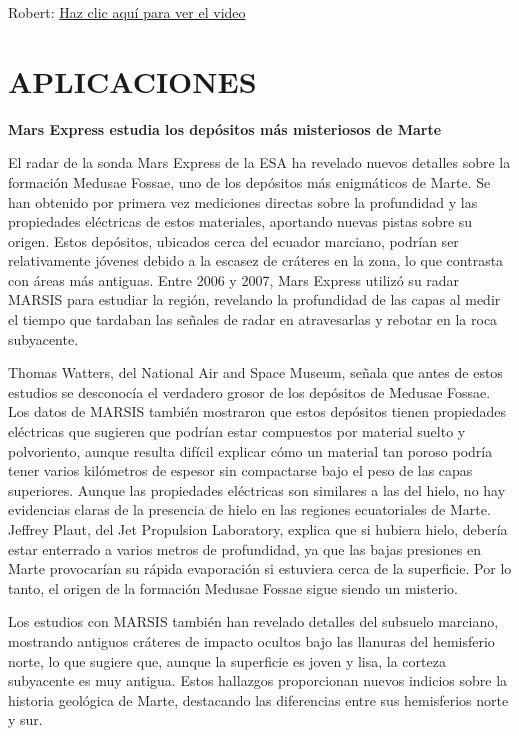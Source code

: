 \documentclass[a4paper]{article}
\begin{document}
\begin{center}
    Robert: \href{https://www.youtube.com/watch?v=k0rbV8mAiCY&ab_channel=MarteEspa%C3%B1ol}{Haz clic aquí para ver el video}
\end{center}

\section{APLICACIONES }
\textbf{Mars Express estudia los depósitos más misteriosos de Marte}

El radar de la sonda Mars Express de la ESA ha revelado nuevos detalles sobre la formación Medusae Fossae, uno de los depósitos más enigmáticos de Marte. Se han obtenido por primera vez mediciones directas sobre la profundidad y las propiedades eléctricas de estos materiales, aportando nuevas pistas sobre su origen. Estos depósitos, ubicados cerca del ecuador marciano, podrían ser relativamente jóvenes debido a la escasez de cráteres en la zona, lo que contrasta con áreas más antiguas. Entre 2006 y 2007, Mars Express utilizó su radar MARSIS para estudiar la región, revelando la profundidad de las capas al medir el tiempo que tardaban las señales de radar en atravesarlas y rebotar en la roca subyacente.

Thomas Watters, del National Air and Space Museum, señala que antes de estos estudios se desconocía el verdadero grosor de los depósitos de Medusae Fossae. Los datos de MARSIS también mostraron que estos depósitos tienen propiedades eléctricas que sugieren que podrían estar compuestos por material suelto y polvoriento, aunque resulta difícil explicar cómo un material tan poroso podría tener varios kilómetros de espesor sin compactarse bajo el peso de las capas superiores. Aunque las propiedades eléctricas son similares a las del hielo, no hay evidencias claras de la presencia de hielo en las regiones ecuatoriales de Marte. Jeffrey Plaut, del Jet Propulsion Laboratory, explica que si hubiera hielo, debería estar enterrado a varios metros de profundidad, ya que las bajas presiones en Marte provocarían su rápida evaporación si estuviera cerca de la superficie. Por lo tanto, el origen de la formación Medusae Fossae sigue siendo un misterio.

Los estudios con MARSIS también han revelado detalles del subsuelo marciano, mostrando antiguos cráteres de impacto ocultos bajo las llanuras del hemisferio norte, lo que sugiere que, aunque la superficie es joven y lisa, la corteza subyacente es muy antigua. Estos hallazgos proporcionan nuevos indicios sobre la historia geológica de Marte, destacando las diferencias entre sus hemisferios norte y sur.
\end{document}

